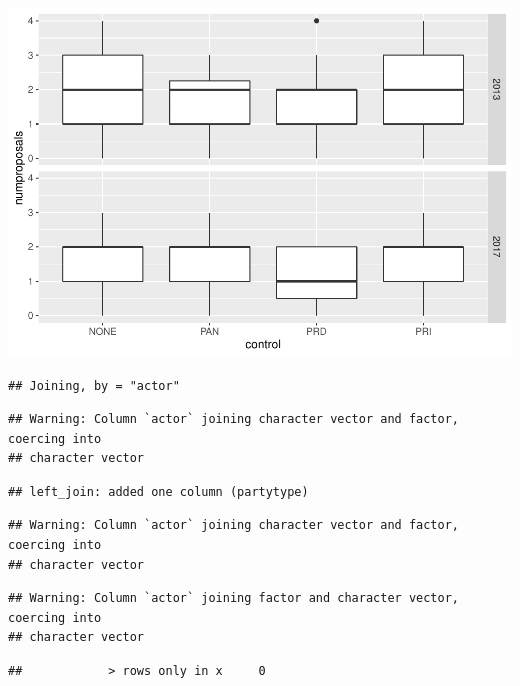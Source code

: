 \documentclass[]{article}
\newenvironment{Shaded}{\begin{snugshade}}{\end{snugshade}}
\newcommand{\CommentTok}[1]{\textcolor[rgb]{0.56,0.35,0.01}{\textit{#1}}}
\newcommand{\KeywordTok}[1]{\textcolor[rgb]{0.13,0.29,0.53}{\textbf{#1}}}
\newcommand{\NormalTok}[1]{#1}
\newcommand{\OperatorTok}[1]{\textcolor[rgb]{0.81,0.36,0.00}{\textbf{#1}}}
\newcommand{\StringTok}[1]{\textcolor[rgb]{0.31,0.60,0.02}{#1}}
\begin{document}
\includegraphics{ProposalAnalysis_files/figure-latex/unnamed-chunk-6-1.pdf}

\begin{Shaded}
\end{Shaded}

\begin{verbatim}
## Joining, by = "actor"
\end{verbatim}

\begin{verbatim}
## Warning: Column `actor` joining character vector and factor, coercing into
## character vector
\end{verbatim}

\begin{verbatim}
## left_join: added one column (partytype)
\end{verbatim}

\begin{verbatim}
## Warning: Column `actor` joining character vector and factor, coercing into
## character vector
\end{verbatim}

\begin{verbatim}
## Warning: Column `actor` joining factor and character vector, coercing into
## character vector
\end{verbatim}

\begin{verbatim}
##            > rows only in x     0
\end{verbatim}
\end{document}
